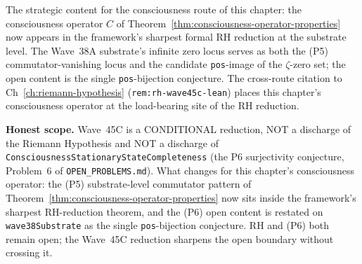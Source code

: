 \begin{remark}
\begin{itemize}
\end{itemize}
The strategic content for the consciousness route of this chapter: the consciousness operator $C$ of Theorem~\ref{thm:consciousness-operator-properties} now appears in the framework's sharpest formal RH reduction at the substrate level. The Wave~38A substrate's infinite zero locus serves as both the (P5) commutator-vanishing locus and the candidate \texttt{pos}-image of the $\zeta$-zero set; the open content is the single \texttt{pos}-bijection conjecture. The cross-route citation to Ch~\ref{ch:riemann-hypothesis} (\texttt{rem:rh-wave45c-lean}) places this chapter's consciousness operator at the load-bearing site of the RH reduction.

\textbf{Honest scope.} Wave~45C is a CONDITIONAL reduction, NOT a discharge of the Riemann Hypothesis and NOT a discharge of \texttt{ConsciousnessStationaryStateCompleteness} (the P6 surjectivity conjecture, Problem~6 of \texttt{OPEN\_PROBLEMS.md}). What changes for this chapter's consciousness operator: the (P5) substrate-level commutator pattern of Theorem~\ref{thm:consciousness-operator-properties} now sits inside the framework's sharpest RH-reduction theorem, and the (P6) open content is restated on \texttt{wave38Substrate} as the single \texttt{pos}-bijection conjecture. RH and (P6) both remain open; the Wave~45C reduction sharpens the open boundary without crossing it.
\end{remark}

